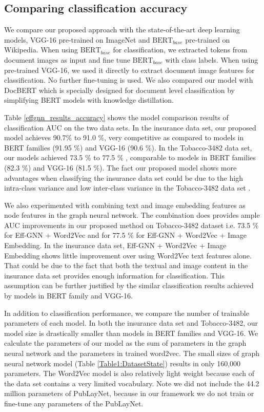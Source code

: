 \documentclass[letterpaper]{article}
\begin{document}
\subsection{Comparing classification accuracy} 
We compare our proposed approach with the state-of-the-art deep learning models, VGG-16 pre-trained on ImageNet and $\text{BERT} _{base}$ pre-trained on Wikipedia. When using $\text{BERT} _{base}$ for classification, we extracted tokens from document images as input and fine tune $\text{BERT} _{base}$ with class labels. When using pre-trained VGG-16, we used it directly to extract document image features for classification. No further fine-tuning is used. We also compared our model with DocBERT which is specially designed for document level classification by simplifying BERT models with knowledge distillation. \par
Table \ref{effgnn_results_accuracy} shows the model comparison results of classification AUC on the two data sets. In the insurance data set, our proposed model achieves 90.7\% to 91.0 \%, very competitive as compared to models in BERT families (91.95 \%) and VGG-16 (90.6 \%). 
In the Tobacco-3482 data set, our models achieved 73.5 \% to 77.5 \% , comparable to models in BERT families (82.3 \%) and VGG-16 (81.5 \%). The fact our proposed model shows more advantages when classifying the insurance data set could be due to the high intra-class variance and low inter-class variance in the Tobacco-3482 data set \cite{KolschAEL17}. \par
We also experimented with combining text and image embedding features as node features in the graph neural network.  The combination does provides ample AUC improvements in our proposed method on Tobacco-3482 dataset  i.e. 73.5 \% for Eff-GNN + Word2Vec and for 77.5 \% for Eff-GNN + Word2Vec + Image Embedding. In the insurance data set, Eff-GNN +  Word2Vec + Image Embedding shows little improvement over using Word2Vec text features alone. That could be due to the fact that both the textual and image content in the insurance data set provides enough information for classification. This assumption can be further justified by the similar classification results achieved by models in BERT family and VGG-16.\par

In addition to classification performance, we compare the number of trainable parameters of each model. In both the insurance data set and Tobacco-3482, our model size is drastically smaller than models in BERT families and VGG-16. We calculate the parameters of our model as the sum of parameters in the graph neural network and the parameters in trained word2vec. The small sizes of graph neural network model (Table \ref{Table1:DatasetState}) results in only 160,000 parameters. The Word2Vec model is also relatively light weight because each of the data set contains a very limited vocabulary. Note we did not include the 44.2 million parameters of PubLayNet, because in our framework we do not train or fine-tune any parameters of the PubLayNet.
\end{document}
